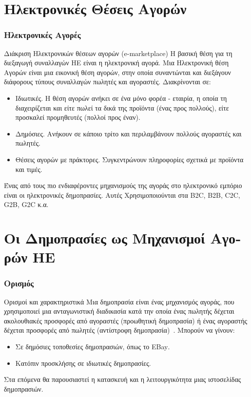 \documentclass[handouts,hyperref={pdfpagelabels=false}]{beamer}
\begin{document}
\section{\foreignlanguage{greek}{Ηλεκτρονικές Θέσεις Αγορών}}
\begin{frame}
\frametitle{\foreignlanguage{greek}{Ηλεκτρονικές Αγορές}}
\begin{block}{Διάκριση Ηλεκτρονικών θέσεων αγορών (\textlatin{e-marketplace})}
Η βασική θέση για τη διεξαγωγή συναλλαγών ΗΕ είναι η ηλεκτρονική αγορά. Μια Ηλεκτρονική θέση Αγορών είναι μια εικονική θέση αγορών, στην οποία συναντώνται και διεξάγουν διάφορους τύπους συναλλαγών πωλητές και αγοραστές. Διακρίνονται σε:
\begin{itemize}
  \item Ιδιωτικές. Η θέση αγορών ανήκει σε ένα μόνο φορέα - εταιρία, η οποία τη διαχειρίζεται και είτε πωλεί τα δικά της προϊόντα (ένας προς πολλούς), είτε προσκαλεί προμηθευτές (πολλοί προς έναν).
  \item Δημόσιες. Ανήκουν σε κάποιο τρίτο και περιλαμβάνουν πολλούς αγοραστές και πωλητές.
  \item Θέσεις αγορών με πράκτορες. Συγκεντρώνουν πληροφορίες σχετικά με προϊόντα και τιμές.
\end{itemize}
Ένας από τους πιο ενδιαφέροντες μηχανισμούς της αγοράς στο ηλεκτρονικό εμπόριο είναι οι ηλεκτρονικές δημοπρασίες. Αυτές Χρησιμοποιούνται στα \textlatin{B2C, B2B, C2C, G2B, G2C} κ.α.
\end{block}
\end{frame}

\section{\foreignlanguage{greek}{Οι Δημοπρασίες ως Μηχανισμοί Αγορών ΗΕ}}
\begin{frame}
\frametitle{\foreignlanguage{greek}{Ορισμός}}
\begin{block}{Ορισμοί και χαρακτηριστικά}
Μια δημοπρασία είναι ένας μηχανισμός αγοράς, που χρησιμοποιεί μια ανταγωνιστική διαδικασία κατά την οποία ένας πωλητής δέχεται ακολουθιακές προσφορές από αγοραστές (προωθητική δημοπρασία) ή ένας αγοραστής δέχεται προσφορές από πωλητές (αντίστροφη δημοπρασία)~\cite{turban_outland_king_lee_liang_turban_2018}. Μπορούν να γίνουν:
\begin{itemize}
  \item Σε δημόσιες τοποθεσίες δημοπρασιών, όπως το \textlatin{EBay}.
  \item Κατόπιν προσκλήσης σε ιδιωτικές δημοπρασίες.
\end{itemize}
Στα επόμενα θα παρουσιαστεί η κατασκευή και η λειτουργικότητα μιας ιστοσελίδας δημοπρασιών.
\end{block}
\end{frame}
\end{document}
